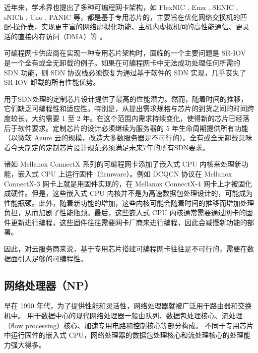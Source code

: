 近年来，学术界也提出了多种可编程网卡架构，如 FlexNIC \cite{kaufmann2015flexnic,kaufmann2016high}, Emu \cite{sultana2017emu}, SENIC \cite{radhakrishnan2014senic}, sNICh \cite{ram2010snich}, Uno \cite{le2017uno}, PANIC \cite{stephens2018your} 等，都是基于专用芯片的，主要旨在优化网络交换机的匹配-操作表，实现更丰富的网络虚拟化功能、主机内虚拟机间的高性能通信、更灵活的直接内存访问（DMA）等 \cite{kaufmann2015flexnic,kaufmann2016high}。

可编程网卡供应商在实现一种专用芯片架构时，面临的一个主要问题是 SR-IOV 是一个全有或全无卸载的例子。如果在可编程网卡中无法成功处理任何所需的 SDN 功能，则 SDN 协议栈必须恢复为通过基于软件的 SDN 实现，几乎丧失了 SR-IOV 卸载的所有性能优势。

用于SDN处理的定制芯片设计提供了最高的性能潜力。然而，随着时间的推移，它们缺乏可编程性和适应性。特别是，从提出需求规格与芯片的到货之间的时间跨度较长，大约需要 1 至 2 年。在这个范围内需求持续变化，使得新的芯片已经落后于软件要求。定制芯片的设计必须继续为服务器的 5 年生命周期提供所有功能（以微软 Azure 云的规模，改造大多数服务器是不可行的）。全有或全无卸载意味着今天制定的定制芯片设计规范必须满足未来7年的所有SDN要求。

诸如 Mellanox ConnectX 系列的可编程网卡添加了嵌入式 CPU 内核来处理新功能，嵌入式 CPU 上运行固件（firmware）。例如 DCQCN 协议在 Mellanox ConnectX-3 网卡上就是用固件实现的，在 Mellanox ConnectX-4 网卡上才被固化成硬件。但是，这些嵌入式 CPU 内核并不是为高速数据包处理设计的，可能成为性能瓶颈。此外，随着新功能的增加，这些内核可能会随着时间的推移而增加处理负担，从而加剧了性能瓶颈。最后，这些嵌入式 CPU 内核通常需要通过网卡的固件更新进行编程，这些固件往往需要网卡厂商来进行编程，因此会减慢新功能的部署。

因此，对云服务商来说，基于专用芯片搭建可编程网卡往往是不可行的，需要在数据面引入足够的可编程性。






\subsection{网络处理器（NP）}
\label{smartnic-np}

早在 1990 年代，为了提供性能和灵活性，网络处理器就被广泛用于路由器和交换机中。
用于数据中心的现代网络处理器一般由队列、数据包处理核心、流处理（flow processing）核心、加速专用电路和控制核心等部分构成。
不同于专用芯片中运行固件的嵌入式 CPU，网络处理器的数据包处理核心和流处理核心的处理能力强大得多。


